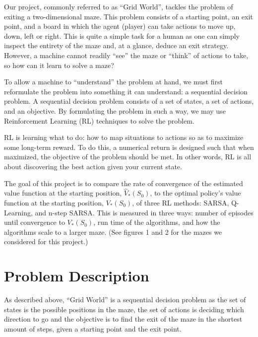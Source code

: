 \documentclass[final,12pt,3p]{elsarticle}
\begin{document}
Our project, commonly referred to as “Grid World”, tackles the problem of exiting a two-dimensional maze. This problem consists of a starting point, an exit point, and a board in which the agent (player) can take actions to move up, down, left or right. This is quite a simple task for a human as one can simply inspect the entirety of the maze and, at a glance, deduce an exit strategy. However, a machine cannot readily “see” the maze or “think” of actions to take, so how can it learn to solve a maze?
\par
To allow a machine to “understand” the problem at hand, we must first reformulate the problem into something it can understand: a sequential decision problem. A sequential decision problem consists of a set of states, a set of actions, and an objective. By formulating the problem in such a way, we may use Reinforcement Learning (RL) techniques to solve the problem. 
\par
RL is learning what to do: how to map situations to actions so as to maximize some long-term reward. To do this, a numerical return is designed such that when maximized, the objective of the problem should be met.\cite{godin} In other words, RL is all about discovering the best action given your current state.
\par
The goal of this project is to compare the rate of convergence of the estimated value function at the starting position, $\hat{V}_{*}(S_0)$, to the optimal policy’s value function at the starting position, $V_{*}(S_0)$, of three RL methods: SARSA, Q-Learning, and n-step SARSA. This is measured in three ways: number of episodes until convergence to $V_{*}(S_0)$, run time of the algorithms, and how the algorithms scale to a larger maze. (See figures 1 and 2 for the mazes we considered for this project.) 

\section{Problem Description}

As described above, “Grid World” is a sequential decision problem as the set of states is the possible positions in the maze, the set of actions is deciding which direction to go and the objective is to find the exit of the maze in the shortest amount of steps, given a starting point and the exit point.
\end{document}

